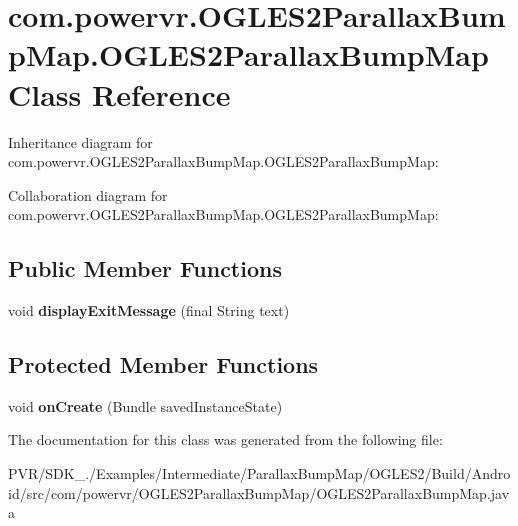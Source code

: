 \hypertarget{classcom_1_1powervr_1_1_o_g_l_e_s2_parallax_bump_map_1_1_o_g_l_e_s2_parallax_bump_map}{\section{com.\+powervr.\+O\+G\+L\+E\+S2\+Parallax\+Bump\+Map.\+O\+G\+L\+E\+S2\+Parallax\+Bump\+Map Class Reference}
\label{classcom_1_1powervr_1_1_o_g_l_e_s2_parallax_bump_map_1_1_o_g_l_e_s2_parallax_bump_map}
}


Inheritance diagram for com.\+powervr.\+O\+G\+L\+E\+S2\+Parallax\+Bump\+Map.\+O\+G\+L\+E\+S2\+Parallax\+Bump\+Map\+:


Collaboration diagram for com.\+powervr.\+O\+G\+L\+E\+S2\+Parallax\+Bump\+Map.\+O\+G\+L\+E\+S2\+Parallax\+Bump\+Map\+:
\subsection*{Public Member Functions}
\begin{DoxyCompactItemize}
\item 
\hypertarget{classcom_1_1powervr_1_1_o_g_l_e_s2_parallax_bump_map_1_1_o_g_l_e_s2_parallax_bump_map_ac43d6ef3772fb8344939b7a40bed69dc}{void {\bfseries display\+Exit\+Message} (final String text)}\label{classcom_1_1powervr_1_1_o_g_l_e_s2_parallax_bump_map_1_1_o_g_l_e_s2_parallax_bump_map_ac43d6ef3772fb8344939b7a40bed69dc}

\end{DoxyCompactItemize}
\subsection*{Protected Member Functions}
\begin{DoxyCompactItemize}
\item 
\hypertarget{classcom_1_1powervr_1_1_o_g_l_e_s2_parallax_bump_map_1_1_o_g_l_e_s2_parallax_bump_map_aee880fa1e092b65a9e78fbd5082f651d}{void {\bfseries on\+Create} (Bundle saved\+Instance\+State)}\label{classcom_1_1powervr_1_1_o_g_l_e_s2_parallax_bump_map_1_1_o_g_l_e_s2_parallax_bump_map_aee880fa1e092b65a9e78fbd5082f651d}

\end{DoxyCompactItemize}


The documentation for this class was generated from the following file\+:\begin{DoxyCompactItemize}
\item 
P\+V\+R/\+S\+D\+K\+\_./\+Examples/\+Intermediate/\+Parallax\+Bump\+Map/\+O\+G\+L\+E\+S2/\+Build/\+Android/src/com/powervr/\+O\+G\+L\+E\+S2\+Parallax\+Bump\+Map/O\+G\+L\+E\+S2\+Parallax\+Bump\+Map.\+java\end{DoxyCompactItemize}
